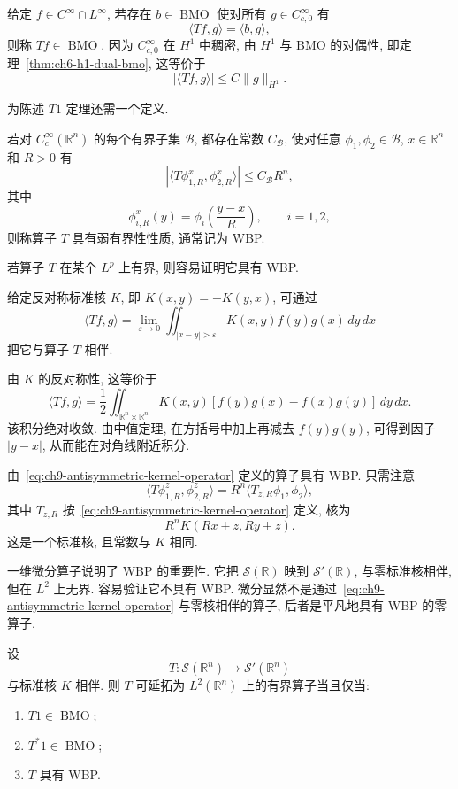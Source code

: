 给定 $f\in C^\infty\cap L^\infty$, 若存在 $b\in\operatorname{BMO}$ 使对所有 $g\in C_{c,0}^\infty$ 有
\[
 \langle Tf,g\rangle=\langle b,g\rangle,
\]
则称 $Tf\in\operatorname{BMO}$. 因为 $C_{c,0}^\infty$ 在 $H^1$ 中稠密, 由 $H^1$ 与 BMO 的对偶性, 即定理~\ref{thm:ch6-h1-dual-bmo}, 这等价于
\[
 |\langle Tf,g\rangle|\le C\|g\|_{H^1}.
\]

为陈述 $T1$ 定理还需一个定义.

\begin{Definition}
\label{def:ch9-weak-boundedness-property}
若对 $C_c^\infty(\mathbb R^n)$ 的每个有界子集 $\mathcal B$, 都存在常数 $C_{\mathcal B}$, 使对任意 $\phi_1,\phi_2\in\mathcal B$, $x\in\mathbb R^n$ 和 $R>0$ 有
\[
 |\langle T\phi_{1,R}^x,\phi_{2,R}^x\rangle|
 \le C_{\mathcal B}R^n,
\]
其中
\[
 \phi_{i,R}^x(y)=\phi_i\left(\frac{y-x}{R}\right),
 \qquad i=1,2,
\]
则称算子 $T$ 具有弱有界性性质, 通常记为 WBP.
\end{Definition}

若算子 $T$ 在某个 $L^p$ 上有界, 则容易证明它具有 WBP.

给定反对称标准核 $K$, 即 $K(x,y)=-K(y,x)$, 可通过
\begin{equation}
 \langle Tf,g\rangle
 =\lim_{\varepsilon\to0}
 \iint_{|x-y|>\varepsilon}K(x,y)f(y)g(x)\,dy\,dx
 \label{eq:ch9-antisymmetric-kernel-operator}
\end{equation}
把它与算子 $T$ 相伴.

\hypertarget{chapter-09-page-215}{}
由 $K$ 的反对称性, 这等价于
\[
 \langle Tf,g\rangle
 =\frac12\iint_{\mathbb R^n\times\mathbb R^n}
 K(x,y)[f(y)g(x)-f(x)g(y)]\,dy\,dx.
\]
该积分绝对收敛. 由中值定理, 在方括号中加上再减去 $f(y)g(y)$, 可得到因子 $|y-x|$, 从而能在对角线附近积分.

由~\eqref{eq:ch9-antisymmetric-kernel-operator} 定义的算子具有 WBP. 只需注意
\[
 \langle T\phi_{1,R}^z,\phi_{2,R}^z\rangle
 =R^n\langle T_{z,R}\phi_1,\phi_2\rangle,
\]
其中 $T_{z,R}$ 按~\eqref{eq:ch9-antisymmetric-kernel-operator} 定义, 核为
\[
 R^nK(Rx+z,Ry+z).
\]
这是一个标准核, 且常数与 $K$ 相同.

一维微分算子说明了 WBP 的重要性. 它把 $\mathcal S(\mathbb R)$ 映到 $\mathcal S'(\mathbb R)$, 与零标准核相伴, 但在 $L^2$ 上无界. 容易验证它不具有 WBP. 微分显然不是通过~\eqref{eq:ch9-antisymmetric-kernel-operator} 与零核相伴的算子, 后者是平凡地具有 WBP 的零算子.

\begin{Theorem}
\label{thm:ch9-t1}
设
\[
 T:\mathcal S(\mathbb R^n)\longrightarrow\mathcal S'(\mathbb R^n)
\]
与标准核 $K$ 相伴. 则 $T$ 可延拓为 $L^2(\mathbb R^n)$ 上的有界算子当且仅当:
\begin{enumerate}[label=(\arabic*)]
\item $T1\in\operatorname{BMO}$;
\item $T^*1\in\operatorname{BMO}$;
\item $T$ 具有 WBP.
\end{enumerate}
\end{Theorem}

